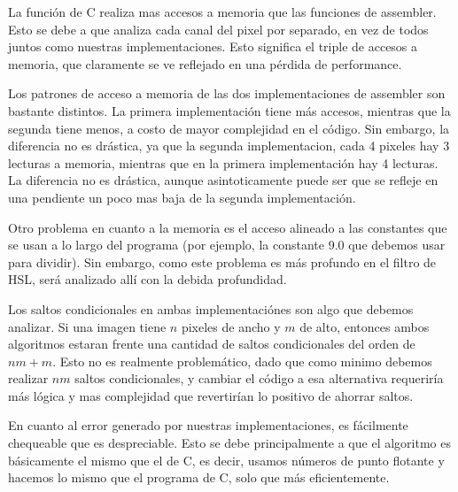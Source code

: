 La función de C realiza mas accesos a memoria que las funciones de assembler. Esto se debe a que analiza cada canal del pixel por separado, en vez de todos juntos como nuestras implementaciones. Esto significa el triple de accesos a memoria, que claramente se ve reflejado en una pérdida de performance.

Los patrones de acceso a memoria de las dos implementaciones de assembler son bastante distintos. La primera implementación tiene más accesos, mientras que la segunda tiene menos, a costo de mayor complejidad en el código. Sin embargo, la diferencia no es drástica, ya que la segunda implementacion, cada 4 pixeles hay 3 lecturas a memoria, mientras que en la primera implementación hay 4 lecturas. La diferencia no es drástica, aunque asintoticamente puede ser que se refleje en una pendiente un poco mas baja de la segunda implementación.

Otro problema en cuanto a la memoria es el acceso alineado a las constantes que se usan a lo largo del programa (por ejemplo, la constante 9.0 que debemos usar para dividir). Sin embargo, como este problema es más profundo en el filtro de HSL, será analizado allí con la debida profundidad.


Los saltos condicionales en ambas implementaciónes son algo que debemos analizar. Si una imagen tiene $n$ pixeles de ancho y $m$ de alto, entonces ambos algoritmos estaran frente una cantidad de saltos condicionales del orden de $nm+m$.
Esto no es realmente problemático, dado que como minimo debemos realizar $nm$ saltos condicionales, y cambiar el código a esa alternativa requeriría más lógica y mas complejidad que revertirían lo positivo de ahorrar saltos.

En cuanto al error generado por nuestras implementaciones, es fácilmente chequeable que es despreciable. Esto se debe principalmente a que el algoritmo es básicamente el mismo que el de C, es decir, usamos números de punto flotante y hacemos lo mismo que el programa de C, solo que más eficientemente.













